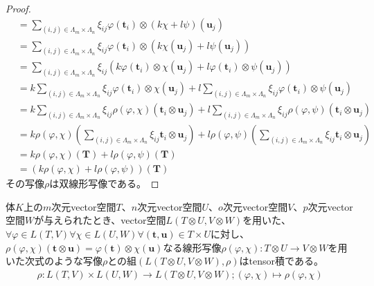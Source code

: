 \documentclass[dvipdfmx]{jsarticle}
\begin{document}
\begin{proof}
\begin{align*}
&= \sum_{(i,j) \in \varLambda_{m} \times \varLambda_{n}} {\xi_{ij}\varphi\left( \mathbf{t}_{i} \right) \otimes (k\chi + l\psi)\left( \mathbf{u}_{j} \right)}\\
&= \sum_{(i,j) \in \varLambda_{m} \times \varLambda_{n}} {\xi_{ij}\varphi\left( \mathbf{t}_{i} \right) \otimes \left( k\chi\left( \mathbf{u}_{j} \right) + l\psi\left( \mathbf{u}_{j} \right) \right)}\\
&= \sum_{(i,j) \in \varLambda_{m} \times \varLambda_{n}} {\xi_{ij}\left( k\varphi\left( \mathbf{t}_{i} \right) \otimes \chi\left( \mathbf{u}_{j} \right) + l\varphi\left( \mathbf{t}_{i} \right) \otimes \psi\left( \mathbf{u}_{j} \right) \right)}\\
&= k\sum_{(i,j) \in \varLambda_{m} \times \varLambda_{n}} {\xi_{ij}\varphi\left( \mathbf{t}_{i} \right) \otimes \chi\left( \mathbf{u}_{j} \right)} + l\sum_{(i,j) \in \varLambda_{m} \times \varLambda_{n}} {\xi_{ij}\varphi\left( \mathbf{t}_{i} \right) \otimes \psi\left( \mathbf{u}_{j} \right)}\\
&= k\sum_{(i,j) \in \varLambda_{m} \times \varLambda_{n}} {\xi_{ij}\rho(\varphi,\chi)\left( \mathbf{t}_{i} \otimes \mathbf{u}_{j} \right)} + l\sum_{(i,j) \in \varLambda_{m} \times \varLambda_{n}} {\xi_{ij}\rho(\varphi,\psi)\left( \mathbf{t}_{i} \otimes \mathbf{u}_{j} \right)}\\
&= k\rho(\varphi,\chi)\left( \sum_{(i,j) \in \varLambda_{m} \times \varLambda_{n}} {\xi_{ij}\mathbf{t}_{i} \otimes \mathbf{u}_{j}} \right) + l\rho(\varphi,\psi)\left( \sum_{(i,j) \in \varLambda_{m} \times \varLambda_{n}} {\xi_{ij}\mathbf{t}_{i} \otimes \mathbf{u}_{j}} \right)\\
&= k\rho(\varphi,\chi)\left( \mathbf{T} \right) + l\rho(\varphi,\psi)\left( \mathbf{T} \right)\\
&= \left( k\rho(\varphi,\chi) + l\rho(\varphi,\psi) \right)\left( \mathbf{T} \right)
\end{align*}
その写像$\rho$は双線形写像である。
\end{proof}
\begin{thm}\label{2.4.5.12}
体$K$上の$m$次元vector空間$T$、$n$次元vector空間$U$、$o$次元vector空間$V$、$p$次元vector空間$W$が与えられたとき、vector空間$L(T \otimes U,V \otimes W)$を用いた、$\forall\varphi \in L(T,V)\forall\chi \in L(U,W)\forall\left( \mathbf{t},\mathbf{u} \right) \in T \times U$に対し、$\rho(\varphi,\chi)\left( \mathbf{t} \otimes \mathbf{u} \right) = \varphi\left( \mathbf{t} \right) \otimes \chi\left( \mathbf{u} \right)$なる線形写像$\rho(\varphi,\chi):T \otimes U \rightarrow V \otimes W$を用いた次式のような写像$\rho$との組$\left( L(T \otimes U,V \otimes W),\rho \right)$はtensor積である。
\begin{align*}
\rho:L(T,V) \times L(U,W) \rightarrow L(T \otimes U,V \otimes W);(\varphi,\chi) \mapsto \rho(\varphi,\chi)
\end{align*}
\end{thm}
\end{document}
